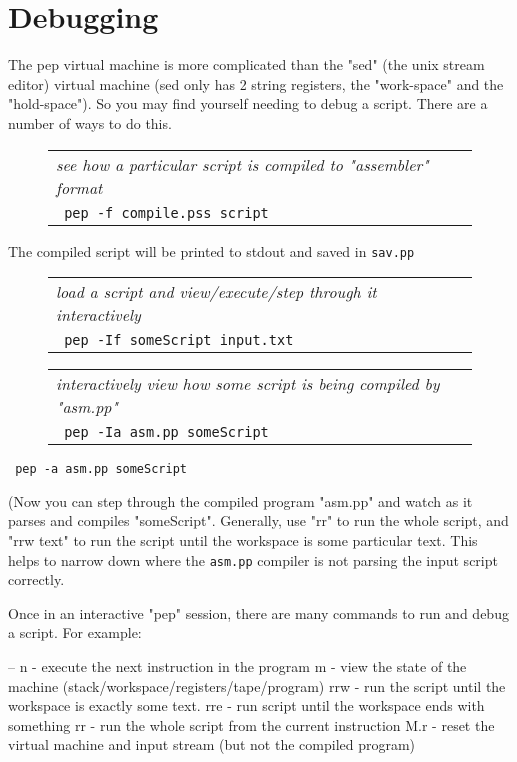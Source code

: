 \documentclass[a4paper,12pt]{article}
\begin{document}
\section{Debugging}

  The pep virtual machine is more complicated than the "sed" (the unix stream
  editor) virtual machine (sed only has 2 string registers, the
  "work-space" and the "hold-space"). So you may find yourself needing to
  debug a script. There are a number of ways to do this.
 \begin{figure}
 \begin{tabular}{ l }
 \emph{ see how a particular script is compiled to "assembler" format } \\ 
 \verb| pep -f compile.pss script |
 \end{tabular} 
 \end{figure}

  The compiled script will be printed to stdout and saved in \texttt{sav.pp}
 \begin{figure}
 \begin{tabular}{ l }
 \emph{ load a script and view/execute/step through it interactively  } \\ 
 \verb| pep -If someScript input.txt |
 \end{tabular} 
 \end{figure}
 \begin{figure}
 \begin{tabular}{ l }
 \emph{ interactively view how some script is being compiled by "asm.pp"  } \\ 
 \verb| pep -Ia asm.pp someScript  |
 \end{tabular} 
 \end{figure} 
 \verb| pep -a asm.pp someScript  |


  (Now you can step through the compiled program "asm.pp" and watch as
  it parses and compiles "someScript". Generally, use "rr" to run the
  whole script, and "rrw text" to run the script until the workspace
  is some particular text. This helps to narrow down where the \texttt{asm.pp}
  compiler is not parsing the input script correctly.

  Once in an interactive "pep" session, there are many commands to
  run and debug a script. For example:

     --
    n - execute the next instruction in the program
    m - view the state of the machine (stack/workspace/registers/tape/program)
    rrw - run the script until the workspace is exactly some text.
    rre - run script until the workspace ends with something
    rr - run the whole script from the current instruction
    M.r - reset the virtual machine and input stream
          (but not the compiled program)
\end{document}
